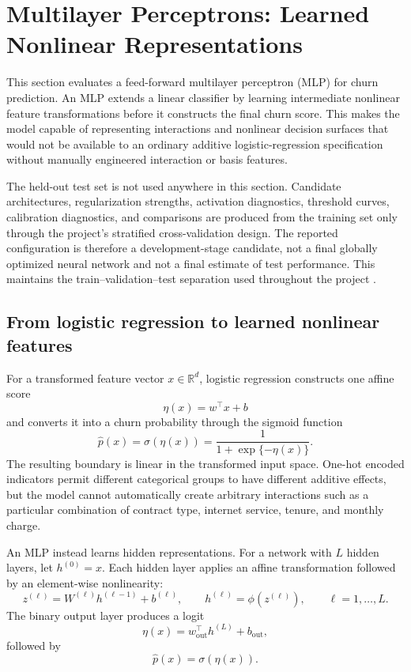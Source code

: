 \newpage
\section{Multilayer Perceptrons: Learned Nonlinear Representations}
\label{sec:multilayer-perceptrons}

This section evaluates a feed-forward multilayer perceptron (MLP) for churn prediction. An MLP extends a linear classifier by learning intermediate nonlinear feature transformations before it constructs the final churn score. This makes the model capable of representing interactions and nonlinear decision surfaces that would not be available to an ordinary additive logistic-regression specification without manually engineered interaction or basis features.

The held-out test set is not used anywhere in this section. Candidate architectures, regularization strengths, activation diagnostics, threshold curves, calibration diagnostics, and comparisons are produced from the training set only through the project's stratified cross-validation design. The reported configuration is therefore a development-stage candidate, not a final globally optimized neural network and not a final estimate of test performance. This maintains the train--validation--test separation used throughout the project \cite{ml-evaluation,dl-tools}.

\subsection{From logistic regression to learned nonlinear features}

For a transformed feature vector \(x\in\mathbb{R}^{d}\), logistic regression constructs one affine score
\[
\eta(x)=w^\top x+b
\]
and converts it into a churn probability through the sigmoid function
\[
\widehat{p}(x)=\sigma(\eta(x))
=
\frac{1}{1+\exp\{-\eta(x)\}}.
\]
The resulting boundary is linear in the transformed input space. One-hot encoded indicators permit different categorical groups to have different additive effects, but the model cannot automatically create arbitrary interactions such as a particular combination of contract type, internet service, tenure, and monthly charge.

An MLP instead learns hidden representations. For a network with \(L\) hidden layers, let \(h^{(0)}=x\). Each hidden layer applies an affine transformation followed by an element-wise nonlinearity:
\[
z^{(\ell)}
=
W^{(\ell)}h^{(\ell-1)}+b^{(\ell)},
\qquad
h^{(\ell)}
=
\phi\!\left(z^{(\ell)}\right),
\qquad
\ell=1,\ldots,L.
\]
The binary output layer produces a logit
\[
\eta(x)
=
w_{\mathrm{out}}^\top h^{(L)}+b_{\mathrm{out}},
\]
followed by
\[
\widehat{p}(x)
=
\sigma\!\left(\eta(x)\right).
\]

